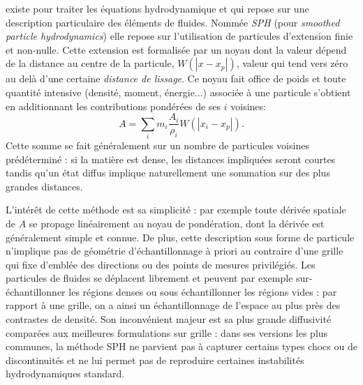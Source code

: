  existe pour traiter les équations hydrodynamique et qui repose sur une description particulaire des éléments de fluides. Nommée \textit{SPH} (pour \textit{smoothed particle hydrodynamics}) elle repose sur l'utilisation de particules d'extension finie et non-nulle. Cette extension est formalisée par un noyau dont la valeur dépend de la distance au centre de la particule, $W(|x-x_p|)$, valeur qui tend vers zéro au delà d'une certaine \textit{distance de lissage}. Ce noyau fait office de poids et toute quantité intensive (densité, moment, énergie...) associée à une particule s'obtient en additionnant les contributions pondérées de ses $i$ voisines:
\begin{equation}
A=\sum_i m_i \frac{A_i}{\rho_i} W(|x_i-x_p|).
\end{equation} 
Cette somme se fait généralement sur un nombre de particules voisines prédéterminé : si la matière est dense, les distances impliquées seront courtes tandis qu'un état diffus implique naturellement une sommation sur des plus grandes distances.
 
L'intérêt de cette méthode est sa simplicité : par exemple toute dérivée spatiale de $A$ se propage linéairement au noyau de pondération, dont la dérivée est généralement simple et connue. De plus, cette description sous forme de particule n'implique pas de géométrie d'échantillonnage à priori au contraire d'une grille qui fixe d'emblée des directions ou des points de mesures privilégiés. Les particules de fluides se déplacent librement et peuvent par exemple sur-échantillonner les régions denses ou sous échantillonner les régions vides : par rapport à une grille, on a ainsi un échantillonnage de l'espace au plus près des contrastes de densité. Son inconvénient majeur est sa plus grande diffusivité comparées aux meilleures formulations sur grille : dans ses versions les plus communes, la méthode SPH ne parvient pas à capturer certains types chocs ou de discontinuités et ne lui permet pas de reproduire certaines instabilités hydrodynamiques standard. 

